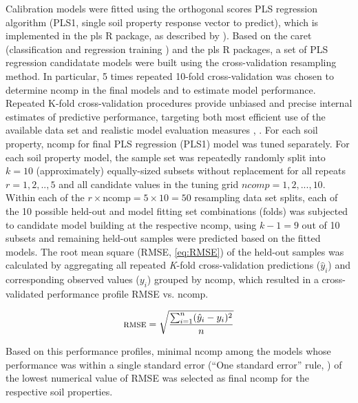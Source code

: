 \documentclass[10pt,letterpaper]{article}
\begin{document}
Calibration models were fitted using the orthogonal scores PLS regression
algorithm (PLS1, single soil property response vector to predict), which is
implemented in the pls \cite{mevik_pls:_2016} R package, as described by
\cite{martens_multivariate_1989}). Based on the caret (classification and
regression training \cite{wing_caret:_2017}) and the pls R packages, a set of
PLS regression candidatate models were built using the cross-validation
resampling method. In particular, 5 times repeated 10-fold cross-validation was
chosen to determine ncomp in the final models and to estimate model performance.
Repeated K-fold cross-validation procedures provide unbiased and precise
internal estimates of predictive performance, targeting both most efficient use
of the available data set and realistic model evaluation measures
\cite{molinaro_prediction_2005}, \cite{kim_estimating_2009}. For each soil
property, ncomp for final PLS regression (PLS1) model was tuned separately. For
each soil property model, the sample set was repeatedly randomly split into $k =
10$ (approximately) equally-sized subsets without replacement for all repeats $r =
1, 2, .., 5$ and all candidate values in the tuning grid $ncomp = 1, 2, ...,
10$. Within each of the $r \times \mathrm{ncomp} = 5 \times 10 = 50$ resampling
data set splits, each of the 10 possible held-out and model fitting set
combinations (folds) was subjected to candidate model building at the respective
ncomp, using $k - 1 = 9$ out of 10 subsets and remaining held-out samples were
predicted based on the fitted models. The root mean square (RMSE, \ref{eq:RMSE})
of the held-out samples was calculated by aggregating all repeated \emph{K}-fold
cross-validation predictions ($\hat{y}_i$) and corresponding observed values
($y_i$) grouped by ncomp, which resulted in a cross-validated performance
profile RMSE vs. ncomp.

\begin{equation}
\label{eq:RMSE}
\textsc{rmse} = \sqrt{\frac{\sum_{i=1}^{n} (\hat{y}_i - y_i)^2}{n}}
\end{equation}

 Based on this performance profiles, minimal ncomp among the models whose
 performance was within a single standard error (``One standard error'' rule,
 \cite{breiman_classification_1984}) of the lowest numerical value of RMSE was
 selected as final ncomp for the respective soil properties.
\end{document}
